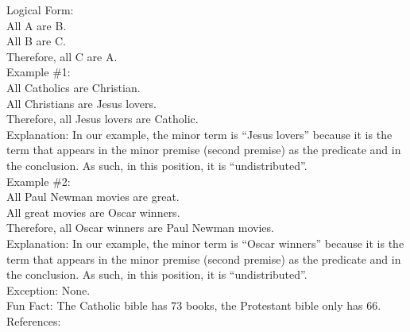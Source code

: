 \documentclass[a4paper,12pt,single,pdftex]{scrartcl}
\begin{document}
    
      Logical Form:
    \\

    
      All A are B.
    \\

    
      All B are C.
    \\

    
      Therefore, all C are A.
    \\

    
      Example \#1:
    \\

    
      All Catholics are Christian.
    \\

    
      All Christians are Jesus lovers.
    \\

    
      Therefore, all Jesus lovers are Catholic.
    \\

    
      Explanation: In our example, the minor term is “Jesus lovers” because it is the term that appears in the minor premise (second premise) as the predicate and in the conclusion.  As such, in this position, it is “undistributed”.
    \\

    
      Example \#2:
    \\

    
      All Paul Newman movies are great.
    \\

    
      All great movies are Oscar winners.
    \\

    
      Therefore, all Oscar winners are Paul Newman movies.
    \\

    
      Explanation: In our example, the minor term is “Oscar winners” because it is the term that appears in the minor premise (second premise) as the predicate and in the conclusion.  As such, in this position, it is “undistributed”.
    \\

    
      Exception: None.
    \\

    
      Fun Fact: The Catholic bible has 73 books, the Protestant bible only has 66.
    \\

    References:

    
      
        
      \\
\end{document}
